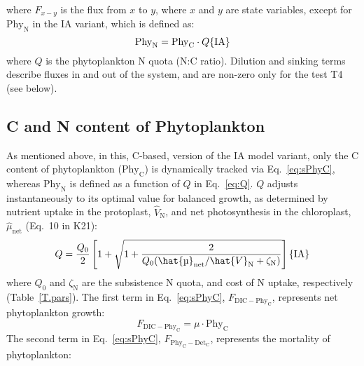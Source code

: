 \documentclass[gmd, manuscript]{copernicus}
\begin{document}
\noindent where $F_{x-y}$ is the flux from $x$ to $y$, where $x$ and $y$ are state variables, except for $\text{Phy}_{\text{N}}$ in the IA variant, which is defined as:
\begin{equation}
  \label{eq:Q}
  \text{Phy}_{\text{N}} = \text{Phy}_{\text{C}} \cdot Q \hfill \{\text{IA}\}
\end{equation}
where $Q$ is the phytoplankton N quota (N:C ratio). Dilution and sinking terms describe fluxes in and out of the system, and are non-zero only for the test T4 (see below).

\subsection{C and N content of Phytoplankton}

As mentioned above, in this, C-based, version of the IA model variant, only the C content of phytoplankton ($\text{Phy}_{\text{C}}$) is dynamically tracked via Eq.~\eqref{eq:sPhyC}, whereas $\text{Phy}_{\text{N}}$ is defined as a function of $Q$ in Eq.~\eqref{eq:Q}.  $Q$ adjusts instantaneously to its optimal value for balanced growth, as determined by nutrient uptake in the protoplast, $\hat{V}_{\text{N}}$, and net photosynthesis in the chloroplast, $\hat{\mu}_{\text{net}}$ (Eq.~10 in K21):
\begin{equation}\label{eq:Qopt}
 Q = \frac{Q_{0}}{2} \left[1+\sqrt{1+\frac{2}{Q_{0}{({\hat{\mu}_{\text{net}}}/{\hat{V}_{\text{N}}}+\zeta_{\text{N}} )}}} \right] \hfill \{\text{IA}\}
\end{equation}
where $Q_{0}$ and $\zeta_{\text{N}}$ are the subsistence N quota, and cost of N uptake, respectively (Table~\ref{T.pars}). The first term in Eq.~\eqref{eq:sPhyC}, $F_{\text{DIC}-\text{Phy}_{\text{C}}}$, represents net phytoplankton growth:
\begin{equation}
  \label{eq:growth}
  F_{\text{DIC}-\text{Phy}_{\text{C}}} = \mu \cdot \text{Phy}_{\text{C}}
\end{equation}
The second term in Eq.~\eqref{eq:sPhyC}, $F_{\text{Phy}_{\text{C}}-\text{Det}_{\text{C}}}$, represents the mortality of phytoplankton:
\end{document}
